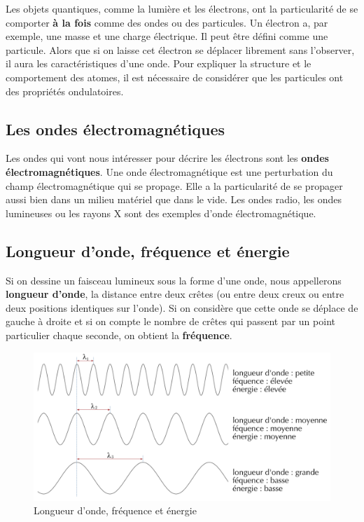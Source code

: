 \documentclass[
  11pt,
  a4paper,
  openany]{book}
\begin{document}
Les objets quantiques, comme la lumière et les électrons, ont la particularité de se comporter \textbf{à la fois} comme des ondes ou des particules. Un électron a, par exemple, une masse et une charge électrique. Il peut être défini comme une particule. Alors que si on laisse cet électron se déplacer librement sans l'observer, il aura les caractéristiques d'une onde. Pour expliquer la structure et le comportement des atomes, il est nécessaire de considérer que les particules ont des propriétés ondulatoires.

\subsection{Les ondes électromagnétiques}\label{les-ondes-uxe9lectromagnuxe9tiques}

Les ondes qui vont nous intéresser pour décrire les électrons sont les \textbf{ondes électromagnétiques}. Une onde électromagnétique est une perturbation du champ électromagnétique qui se propage. Elle a la particularité de se propager aussi bien dans un milieu matériel que dans le vide. Les ondes radio, les ondes lumineuses ou les rayons X sont des exemples d'onde électromagnétique.

\subsection{Longueur d'onde, fréquence et énergie}\label{longueur-donde-fruxe9quence-et-uxe9nergie}

Si on dessine un faisceau lumineux sous la forme d'une onde, nous appellerons \textbf{longueur d'onde}, la distance entre deux crêtes (ou entre deux creux ou entre deux positions identiques sur l'onde). Si on considère que cette onde se déplace de gauche à droite et si on compte le nombre de crêtes qui passent par un point particulier chaque seconde, on obtient la \textbf{fréquence}.

\begin{figure}

{\centering \includegraphics[width=0.75\linewidth]{images/ondes-electromagnetiques} 

}

\caption{Longueur d'onde, fréquence et énergie}\label{fig:ondes-electromagnetiques}
\end{figure}
\end{document}
